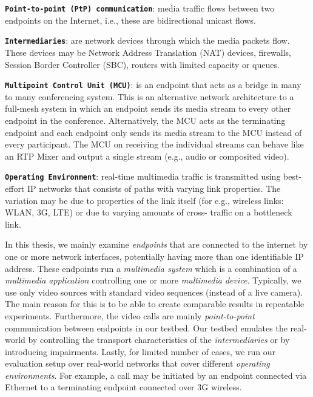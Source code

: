 
\textbf{\texttt{Point-to-point (PtP) communication}}: media traffic flows
between two endpoints on the Internet, i.e., these are bidirectional unicast
flows.

\textbf{\texttt{Intermediaries}}: are network devices through which the media
packets flow. These devices may be Network Address Translation (NAT) devices,
firewalls, Session Border Controller (SBC), routers with limited capacity or
queues.

\textbf{\texttt{Multipoint Control Unit (MCU)}}: is an endpoint that acts as a
bridge in many to many conferencing system. This is an alternative network
architecture to a full-mesh system in which an endpoint sends its media stream
to every other endpoint in the conference. Alternatively, the MCU acts as the
terminating endpoint and each endpoint only sends its media stream to the MCU
instead of every participant. The MCU on receiving the individual streams can
behave like an RTP Mixer and output a single stream (e.g., audio or composited
video).

\textbf{\texttt{Operating Environment}}: real-time multimedia traffic is
transmitted using best-effort IP networks that consists of paths with varying
link properties. The variation may be due to properties of the link itself
(for e.g., wireless links: WLAN, 3G, LTE) or due to varying amounts of cross-
traffic on a bottleneck link.


In this thesis, we mainly examine \emph{endpoints} that are connected to the
internet by one or more network interfaces, potentially having more than one
identifiable IP address. These endpoints run a \emph{multimedia system} which
is a combination of a \emph{multimedia application} controlling one or more
\emph{multimedia device}. Typically, we use only video sources with standard
video sequences (instead of a live camera). The main reason for this is to be
able to create comparable results in repeatable experiments. Furthermore, the
video calls are mainly \emph{point-to-point} communication between endpoints
in our testbed. Our testbed emulates the real-world by controlling the
transport characteristics of the \emph{intermediaries} or by introducing
impairments. Lastly, for limited number of cases, we run our evaluation setup
over real-world networks that cover different \emph{operating environments}.
For example, a call may be initiated by an endpoint connected via Ethernet to
a terminating endpoint connected over 3G wireless.

